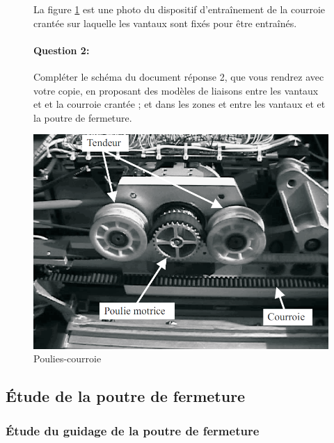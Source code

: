 \begin{figure}[!h]
\begin{minipage}{0.6\linewidth}
La figure \ref{fig9} est une photo du dispositif d'entraînement de la courroie crantée sur laquelle les vantaux sont fixés pour être entraînés.
\paragraph{Question 2:} Compléter le schéma du document réponse 2, que vous rendrez avec votre copie, en proposant des modèles de liaisons entre les vantaux et et la courroie crantée ; et dans les zones et entre
les vantaux et et la poutre de fermeture.
\end{minipage}
\hfill
\begin{minipage}{0.35\linewidth}
 \centering\includegraphics[width=0.8\linewidth]{img/Portes10.png}
 \caption{Poulies-courroie}
 \label{fig9}
 \end{minipage}
\end{figure}

\subsection{Étude de la poutre de fermeture}

\subsubsection{Étude du guidage de la poutre de fermeture}

